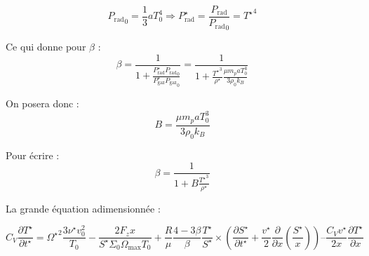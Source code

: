 \begin{equation}
    {P_\mathrm{rad}}_0 = \frac{1}{3} a T_0^4 \Rightarrow P_\mathrm{rad}^\star = \frac{P_\mathrm{rad}}{{P_\mathrm{rad}}_0} = {T^\star}^4
\end{equation}

Ce qui donne pour $\beta$ :
\begin{equation}
    \beta = \frac{1}{1 + \frac{P_\mathrm{rad}^\star {P_\mathrm{rad}}_0}{P_\mathrm{gaz}^\star {P_\mathrm{gaz}}_0}} = \frac{1}{1 + \frac{{T^\star}^3}{\rho^\star} \frac{\mu m_p a T_0^3}{3 \rho_0 k_B}}
\end{equation}

On posera donc :
\begin{equation}
    B = \frac{\mu m_p a T_0^3}{3 \rho_0 k_B}
\end{equation}

Pour écrire :
\begin{equation}
    \beta = \frac{1}{1 + B \frac{{T^\star}^3}{\rho^\star}}
\end{equation}

La grande équation adimensionnée :

\begin{equation}
    C_V \frac{\partial T^{\star}}{\partial t^{\star}} =
    {\Omega^\star}^2 \frac{3 \nu^\star v_0^2}{T_0} - \frac{2 F_z x}{S^\star \Sigma_0 \Omega_\mathrm{max} T_0} +
    \frac{R}{\mu} \frac{4-3\beta}{\beta} \frac{T^\star}{S^\star} ×
    \left( \frac{\partial S^\star}{\partial t^\star} + \frac{v^\star}{2} \frac{\partial}{\partial x} \left(\frac{S^\star}{x}\right) \right) –
    \frac{C_V v^\star}{2 x} \frac{\partial T^\star}{\partial x}
\end{equation}

